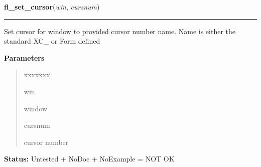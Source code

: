 \hspace{.8\funcindent}\begin{boxedminipage}{\funcwidth}

    \raggedright \textbf{fl\_set\_cursor}(\textit{win}, \textit{cursnum})

    \vspace{-1.5ex}

    \rule{\textwidth}{0.5\fboxrule}
\setlength{\parskip}{2ex}
    Set cursor for window to provided cursor number name. Name is either 
    the standard XC\_ or Form defined

\setlength{\parskip}{1ex}
      \textbf{Parameters}
      \vspace{-1ex}

      \begin{quote}
        \begin{Ventry}{xxxxxxx}

          \item[win]

          window

          \item[cursnum]

          cursor number

        \end{Ventry}

      \end{quote}

\textbf{Status:} Untested + NoDoc + NoExample = NOT OK



    \end{boxedminipage}

    \label{xformslib:library:fl_set_cursor_color}

    \vspace{0.5ex}

